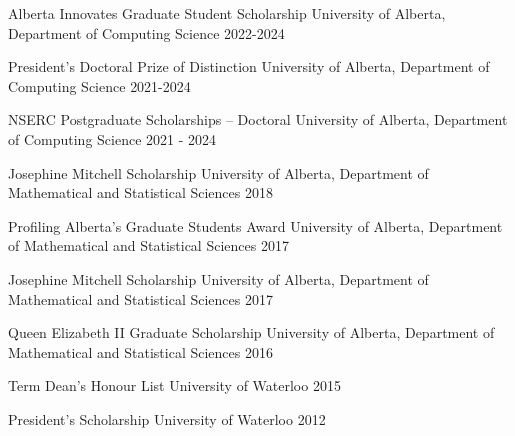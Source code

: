 \begin{cvhonors}
  \cvhonor
    {Alberta Innovates Graduate Student Scholarship}
    {University of Alberta, Department of Computing Science}
    {2022-2024}

  \cvhonor
    {President’s Doctoral Prize of Distinction}
    {University of Alberta, Department of Computing Science}
    {2021-2024}

  \cvhonor
    {NSERC Postgraduate Scholarships – Doctoral}
    {University of Alberta, Department of Computing Science}
    {2021 - 2024}

  \cvhonor
    {Josephine Mitchell Scholarship}
    {University of Alberta, Department of Mathematical and Statistical Sciences}
    {2018}

  \cvhonor
    {Profiling Alberta's Graduate Students Award}
    {University of Alberta, Department of Mathematical and Statistical Sciences}
    {2017}

  \cvhonor
    {Josephine Mitchell Scholarship}
    {University of Alberta, Department of Mathematical and Statistical Sciences}
    {2017}

  \cvhonor
    {Queen Elizabeth II Graduate Scholarship}
    {University of Alberta, Department of Mathematical and Statistical Sciences}
    {2016}

  \cvhonor
    {Term Dean's Honour List}
    {University of Waterloo}
    {2015}

  \cvhonor
    {President's Scholarship}
    {University of Waterloo}
    {2012}

\end{cvhonors}
